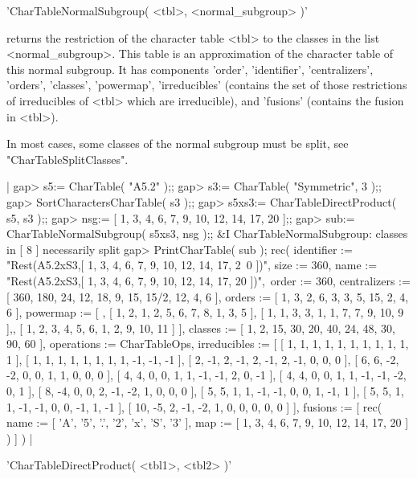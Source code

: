 'CharTableNormalSubgroup( <tbl>, <normal\_subgroup> )'

returns the restriction of the character table <tbl> to the classes in
the list <normal\_subgroup>.
This table is an approximation of the character table of this normal
subgroup. It has components 'order', 'identifier', 'centralizers',
'orders', 'classes', 'powermap', 'irreducibles' (contains the set of
those restrictions of irreducibles of <tbl> which are irreducible), and
'fusions' (contains the fusion in <tbl>).

In most cases, some classes of the normal subgroup must be split, see
"CharTableSplitClasses".

|    gap> s5:= CharTable( "A5.2" );;
    gap> s3:= CharTable( "Symmetric", 3 );;
    gap> SortCharactersCharTable( s3 );;
    gap> s5xs3:= CharTableDirectProduct( s5, s3 );;
    gap> nsg:= [ 1, 3, 4, 6, 7, 9, 10, 12, 14, 17, 20 ];;
    gap> sub:= CharTableNormalSubgroup( s5xs3, nsg );;
    &I CharTableNormalSubgroup: classes in [ 8 ] necessarily split
    gap> PrintCharTable( sub );
    rec( identifier := "Rest(A5.2xS3,[ 1, 3, 4, 6, 7, 9, 10, 12, 14, 17, 2\
    0 ])", size :=
    360, name := "Rest(A5.2xS3,[ 1, 3, 4, 6, 7, 9, 10, 12, 14, 17, 20 ])",\
     order := 360, centralizers := [ 360, 180, 24, 12, 18, 9, 15, 15/2,
      12, 4, 6 ], orders := [ 1, 3, 2, 6, 3, 3, 5, 15, 2, 4, 6
     ], powermap := [ , [ 1, 2, 1, 2, 5, 6, 7, 8, 1, 3, 5 ],
      [ 1, 1, 3, 3, 1, 1, 7, 7, 9, 10, 9 ],,
      [ 1, 2, 3, 4, 5, 6, 1, 2, 9, 10, 11 ] ], classes :=
    [ 1, 2, 15, 30, 20, 40, 24, 48, 30, 90, 60
     ], operations := CharTableOps, irreducibles :=
    [ [ 1, 1, 1, 1, 1, 1, 1, 1, 1, 1, 1 ],
      [ 1, 1, 1, 1, 1, 1, 1, 1, -1, -1, -1 ],
      [ 2, -1, 2, -1, 2, -1, 2, -1, 0, 0, 0 ],
      [ 6, 6, -2, -2, 0, 0, 1, 1, 0, 0, 0 ],
      [ 4, 4, 0, 0, 1, 1, -1, -1, 2, 0, -1 ],
      [ 4, 4, 0, 0, 1, 1, -1, -1, -2, 0, 1 ],
      [ 8, -4, 0, 0, 2, -1, -2, 1, 0, 0, 0 ],
      [ 5, 5, 1, 1, -1, -1, 0, 0, 1, -1, 1 ],
      [ 5, 5, 1, 1, -1, -1, 0, 0, -1, 1, -1 ],
      [ 10, -5, 2, -1, -2, 1, 0, 0, 0, 0, 0 ] ], fusions := [ rec(
          name := [ 'A', '5', '.', '2', 'x', 'S', '3' ],
          map := [ 1, 3, 4, 6, 7, 9, 10, 12, 14, 17, 20 ] ) ] ) |

%
\index{Cartesian product}%
%
%

'CharTableDirectProduct( <tbl1>, <tbl2> )'

